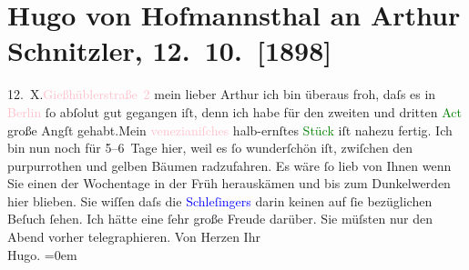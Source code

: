 
               \section[Hugo von Hofmannsthal an Arthur Schnitzler, 12. 10. {[}1898{]}]{ Hugo von Hofmannsthal an Arthur Schnitzler, 12. 10. {[}1898{]}}\nopagebreak{}\rehead{ }\normalsize\beginnumbering{} \toendnotes[C]{\smallbreak\pagebreak[2]} 
\toendnotes[C]{\smallbreak}\pstart
           {\pb}12. X.\hfill \textcolor{pink}{Gießhüblerstraße 2}\pend
           \pstart{}mein lieber Arthur\pend\pstart
           ich bin überaus froh, daſs es in \textcolor{pink}{Berlin}{ }ſo
                    abſolut gut gegangen iſt, denn ich habe für den zweiten und dritten \textcolor{green}{Act} große Angſt gehabt.\hspace*{1.5em}Mein \textcolor{pink}{venezianiſches} halb-ernſtes \textcolor{green}{Stück} iſt nahezu fertig. Ich bin nun noch für 5–6 Tage
                    hier, weil es ſo wunderſchön iſt, zwiſchen {\pb}den purpurrothen und gelben
                    Bäumen radzufahren. Es wäre ſo lieb von Ihnen wenn Sie einen der Wochentage in
                    der Früh herauskämen und bis zum Dunkelwerden hier blieben. Sie wiſſen daſs die
                        \textcolor{blue}{Schleſingers} darin keinen auf
                    ſie bezüglichen Beſuch {\pb}ſehen. Ich hätte eine ſehr große Freude darüber. Sie müſsten nur den Abend
                    vorher telegraphieren.\pend
           \pstart
           Von Herzen Ihr{\\[\baselineskip]}\spacefill\mbox{Hugo.}\pend
           \leftskip=0em{}\endnumbering{}  